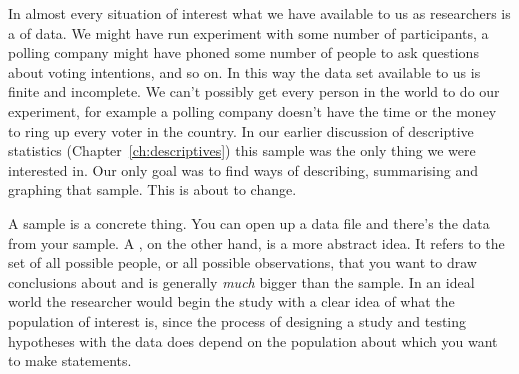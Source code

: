 In almost every situation of interest what we have available to us as researchers is a  of data. We might have run experiment with some number of participants, a polling company might have phoned some number of people to ask questions about voting intentions, and so on. In this way the data set available to us is finite and incomplete. We can't possibly get every person in the  world to do our experiment, for example a polling company doesn't have the time or the money to ring up every voter in the country. In our earlier discussion of descriptive statistics (Chapter~\ref{ch:descriptives}) this sample was the only thing we were interested in. Our only goal was to find ways of describing, summarising and graphing that sample. This is about to change.


A sample is a concrete thing. You can open up a data file and there's the data from your sample. A , on the other hand, is a more abstract idea. It refers to the set of all possible people, or all possible observations, that you want to draw conclusions about and is generally {\it much} bigger than the sample. In an ideal world the researcher would begin the study with a clear idea of what the population of interest is, since the process of designing a study and testing hypotheses with the data does depend on the population about which you want to make statements. 

